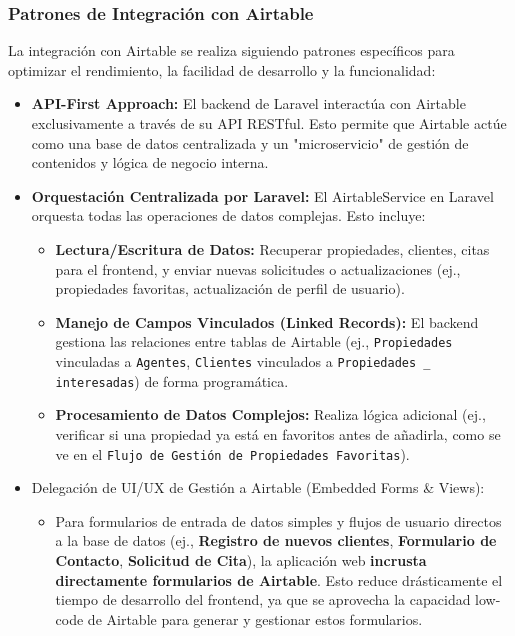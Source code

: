 \subsubsection{Patrones de Integración con Airtable}


La integración con Airtable se realiza siguiendo patrones específicos para optimizar el rendimiento, la facilidad de desarrollo y la funcionalidad:

\begin{itemize}
    \item \textbf{API-First Approach:} El backend de Laravel interactúa con Airtable exclusivamente a través de su API RESTful. Esto permite que Airtable actúe como una base de datos centralizada y un "microservicio" de gestión de contenidos y lógica de negocio interna.

    \item \textbf{Orquestación Centralizada por Laravel:} El AirtableService en Laravel orquesta todas las operaciones de datos complejas. Esto incluye:

    \begin{itemize}
        \item \textbf{Lectura/Escritura de Datos:} Recuperar propiedades, clientes, citas para el frontend, y enviar nuevas solicitudes o actualizaciones (ej., propiedades favoritas, actualización de perfil de usuario).

        \item \textbf{Manejo de Campos Vinculados (Linked Records):} El backend gestiona las relaciones entre tablas de Airtable (ej., \texttt{Propiedades} vinculadas a \texttt{Agentes}, \texttt{Clientes} vinculados a \texttt{Propiedades \_ interesadas}) de forma programática.

        \item \textbf{Procesamiento de Datos Complejos:} Realiza lógica adicional (ej., verificar si una propiedad ya está en favoritos antes de añadirla, como se ve en el \texttt{Flujo de Gestión de Propiedades Favoritas}).
    \end{itemize}

\clearpage

    \item Delegación de UI/UX de Gestión a Airtable (Embedded Forms \& Views):
    \begin{itemize}
        \item Para formularios de entrada de datos simples y flujos de usuario directos a la base de datos (ej., \textbf{Registro de nuevos clientes},\textbf{ Formulario de Contacto}, \textbf{Solicitud de Cita}), la aplicación web \textbf{incrusta directamente formularios de Airtable}. Esto reduce drásticamente el tiempo de desarrollo del frontend, ya que se aprovecha la capacidad low-code de Airtable para generar y gestionar estos formularios.


\end{itemize}
\end{itemize}
